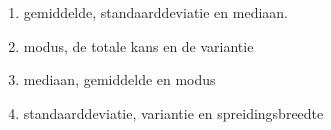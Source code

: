 \begin{enumerate}[label=(\alph*)]
    \item gemiddelde, standaarddeviatie en mediaan.
    \item modus, de totale kans en de variantie
    \item mediaan, gemiddelde en modus
    \item standaarddeviatie, variantie en spreidingsbreedte
\end{enumerate}
